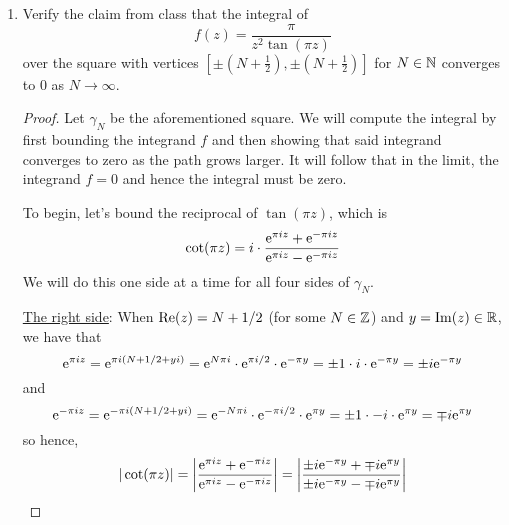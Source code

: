 \documentclass[../psets.tex]{subfiles}
\begin{document}
\begin{enumerate}[ref={A.\arabic*}]
\begin{proof}
        \begin{align*}
            2\pi &= 2\int_{-r}^r\frac{\dd{x}}{\cosh x}\\
            \pi &= \int_{-r}^r\frac{\dd{x}}{\cosh x}
        \end{align*}
        Taking the limit as $r\to\infty$ yields the desired result.
    \end{proof}
    \item \label{prb:5.A.5}Verify the claim from class that the integral of
    \begin{equation*}
        f(z) = \frac{\pi}{z^2\tan(\pi z)}
    \end{equation*}
    over the square with vertices $[\pm(N+\tfrac{1}{2}),\pm(N+\tfrac{1}{2})]$ for $N\in\N$ converges to 0 as $N\to\infty$.
    \begin{proof}
        Let $\gamma_N$ be the aforementioned square. We will compute the integral by first bounding the integrand $f$ and then showing that said integrand converges to zero as the path grows larger. It will follow that in the limit, the integrand $f=0$ and hence the integral must be zero.\par
        To begin, let's bound the reciprocal of $\tan(\pi z)$, which is
        \begin{equation*}
            \cot(\pi z) = i\cdot\frac{\e[\pi iz]+\e[-\pi iz]}{\e[\pi iz]-\e[-\pi iz]}
        \end{equation*}
        We will do this one side at a time for all four sides of $\gamma_N$.\par
        \underline{The right side}: When $\re(z)=N+1/2$ (for some $N\in\Z$) and $y=\im(z)\in\R$, we have that
        \begin{equation*}
            \e[\pi iz] = \e[\pi i(N+1/2+yi)]
            = \e[N\pi i]\cdot\e[\pi i/2]\cdot\e[-\pi y]
            = \pm 1\cdot i\cdot\e[-\pi y]
            = \pm i\e[-\pi y]
        \end{equation*}
        and
        \begin{equation*}
            \e[-\pi iz] = \e[-\pi i(N+1/2+yi)]
            = \e[-N\pi i]\cdot\e[-\pi i/2]\cdot\e[\pi y]
            = \pm 1\cdot -i\cdot\e[\pi y]
            = \mp i\e[\pi y]
        \end{equation*}
        so hence,
        \begin{equation*}
            |\cot(\pi z)| = \left| \frac{\e[\pi iz]+\e[-\pi iz]}{\e[\pi iz]-\e[-\pi iz]} \right|
            = \left| \frac{\pm i\e[-\pi y]+\mp i\e[\pi y]}{\pm i\e[-\pi y]-\mp i\e[\pi y]} \right|

\end{equation*}
\end{proof}
\end{enumerate}
\end{document}
